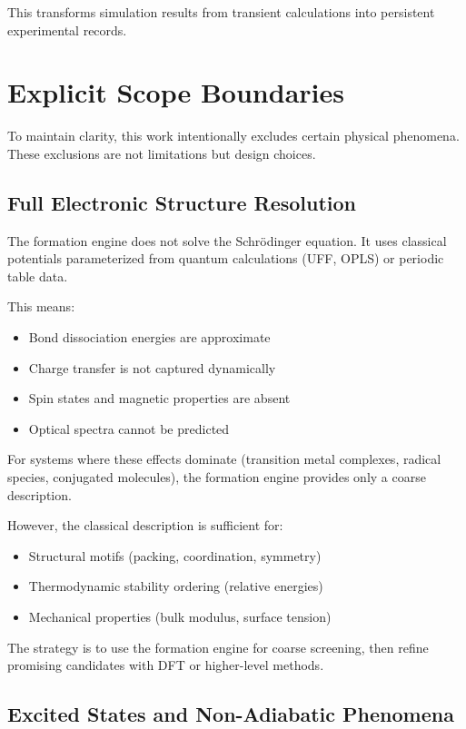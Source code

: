 \documentclass[11pt]{article}
\begin{document}
This transforms simulation results from transient calculations into persistent experimental records.

\section{Explicit Scope Boundaries}

To maintain clarity, this work intentionally excludes certain physical phenomena. These exclusions are not limitations but design choices.

\subsection{Full Electronic Structure Resolution}

The formation engine does not solve the Schrödinger equation. It uses classical potentials parameterized from quantum calculations (UFF, OPLS) or periodic table data.

This means:
\begin{itemize}
\item Bond dissociation energies are approximate
\item Charge transfer is not captured dynamically
\item Spin states and magnetic properties are absent
\item Optical spectra cannot be predicted
\end{itemize}

For systems where these effects dominate (transition metal complexes, radical species, conjugated molecules), the formation engine provides only a coarse description.

However, the classical description is sufficient for:
\begin{itemize}
\item Structural motifs (packing, coordination, symmetry)
\item Thermodynamic stability ordering (relative energies)
\item Mechanical properties (bulk modulus, surface tension)
\end{itemize}

The strategy is to use the formation engine for coarse screening, then refine promising candidates with DFT or higher-level methods.

\subsection{Excited States and Non-Adiabatic Phenomena}
\end{document}

